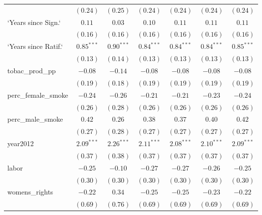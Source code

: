 \begin{table}[!h]
\begin{center}
\begin{tabular}{l c c c c c c }
                        & $(0.24)$     & $(0.25)$     & $(0.24)$     & $(0.24)$     & $(0.24)$     & $(0.24)$     \\
`Years since Sign.`     & $0.11$       & $0.03$       & $0.10$       & $0.11$       & $0.11$       & $0.11$       \\
                        & $(0.16)$     & $(0.16)$     & $(0.16)$     & $(0.16)$     & $(0.16)$     & $(0.16)$     \\
`Years since Ratif.`    & $0.85^{***}$ & $0.90^{***}$ & $0.84^{***}$ & $0.84^{***}$ & $0.84^{***}$ & $0.85^{***}$ \\
                        & $(0.13)$     & $(0.14)$     & $(0.13)$     & $(0.13)$     & $(0.13)$     & $(0.13)$     \\
tobac\_prod\_pp         & $-0.08$      & $-0.14$      & $-0.08$      & $-0.08$      & $-0.08$      & $-0.08$      \\
                        & $(0.19)$     & $(0.18)$     & $(0.19)$     & $(0.19)$     & $(0.19)$     & $(0.19)$     \\
perc\_female\_smoke     & $-0.24$      & $-0.26$      & $-0.21$      & $-0.21$      & $-0.23$      & $-0.24$      \\
                        & $(0.26)$     & $(0.28)$     & $(0.26)$     & $(0.26)$     & $(0.26)$     & $(0.26)$     \\
perc\_male\_smoke       & $0.42$       & $0.26$       & $0.38$       & $0.37$       & $0.40$       & $0.42$       \\
                        & $(0.27)$     & $(0.28)$     & $(0.27)$     & $(0.27)$     & $(0.27)$     & $(0.27)$     \\
year2012                & $2.09^{***}$ & $2.26^{***}$ & $2.11^{***}$ & $2.08^{***}$ & $2.10^{***}$ & $2.09^{***}$ \\
                        & $(0.37)$     & $(0.38)$     & $(0.37)$     & $(0.37)$     & $(0.37)$     & $(0.37)$     \\
labor                   & $-0.25$      & $-0.10$      & $-0.27$      & $-0.27$      & $-0.26$      & $-0.25$      \\
                        & $(0.30)$     & $(0.30)$     & $(0.30)$     & $(0.30)$     & $(0.30)$     & $(0.30)$     \\
womens\_rights          & $-0.22$      & $0.34$       & $-0.25$      & $-0.25$      & $-0.23$      & $-0.22$      \\
                        & $(0.69)$     & $(0.76)$     & $(0.69)$     & $(0.69)$     & $(0.69)$     & $(0.69)$     \\

\end{tabular}
\end{center}
\end{table}
